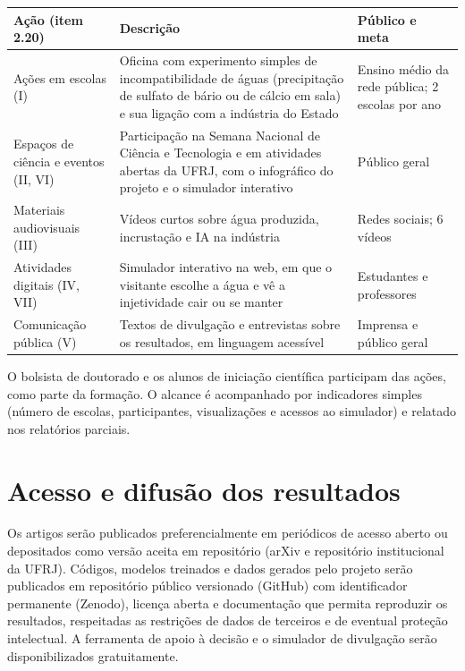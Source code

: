 \documentclass[11pt,a4paper]{article}
\newcommand{\itemedital}[1]{}
\begin{document}
\begin{center}
\small
\begin{tabularx}{\textwidth}{@{}>{\raggedright\arraybackslash}p{}>{\raggedright\arraybackslash}X>{\raggedright\arraybackslash}p{}@{}}
\toprule
\textbf{Ação (item 2.20)} & \textbf{Descrição} & \textbf{Público e meta} \\
\midrule
Ações em escolas (I) & Oficina com experimento simples de incompatibilidade de águas (precipitação de sulfato de bário ou de cálcio em sala) e sua ligação com a indústria do Estado & Ensino médio da rede pública; 2 escolas por ano \\
Espaços de ciência e eventos (II, VI) & Participação na Semana Nacional de Ciência e Tecnologia e em atividades abertas da UFRJ, com o infográfico do projeto e o simulador interativo & Público geral \\
Materiais audiovisuais (III) & Vídeos curtos sobre água produzida, incrustação e IA na indústria & Redes sociais; 6 vídeos \\
Atividades digitais (IV, VII) & Simulador interativo na web, em que o visitante escolhe a água e vê a injetividade cair ou se manter & Estudantes e professores \\
Comunicação pública (V) & Textos de divulgação e entrevistas sobre os resultados, em linguagem acessível & Imprensa e público geral \\
\bottomrule
\end{tabularx}
\end{center}

\noindent O bolsista de doutorado e os alunos de iniciação científica participam das ações,
como parte da formação. O alcance é acompanhado por indicadores simples (número de escolas,
participantes, visualizações e acessos ao simulador) e relatado nos relatórios parciais.

\section{Acesso e difusão dos resultados}\itemedital{Anexo 1 D}
Os artigos serão publicados preferencialmente em periódicos de acesso aberto ou depositados
como versão aceita em repositório (arXiv e repositório institucional da UFRJ). Códigos,
modelos treinados e dados gerados pelo projeto serão publicados em repositório público
versionado (GitHub) com identificador permanente (Zenodo), licença aberta e documentação que
permita reproduzir os resultados, respeitadas as restrições de dados de terceiros e de
eventual proteção intelectual. A ferramenta de apoio à decisão e o simulador de divulgação
serão disponibilizados gratuitamente.
\end{document}
